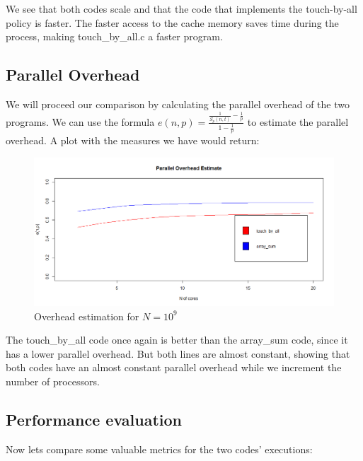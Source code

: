 \documentclass{article}
\begin{document}
We see that both codes scale and that the code that implements the touch-by-all policy is faster. The faster access to the cache memory saves time during the process, making touch\_by\_all.c a faster program.

\subsection{Parallel Overhead}
We will proceed our comparison by calculating the parallel overhead of the two programs. We can use the formula $ e(n,p) =\frac{\frac{1}{S_p(n,t)}-\frac{1}{p}}{1-\frac{1}{p}}$ to estimate the parallel overhead.  A plot with the measures we have would return:

\begin{figure}[H] %
	\centering
	\includegraphics[width=0.8\columnwidth]{graphs/exercise_0_overhead} %
	\caption{Overhead estimation for $N=10^9$}
\end{figure}
The touch\_by\_all code once again is better than the array\_sum code, since it has a lower parallel overhead.
But both lines are almost constant, showing that both codes have an almost constant parallel overhead while we increment the number of processors.

\subsection{Performance evaluation}
Now lets compare some valuable metrics for the two codes' executions:
\end{document}
